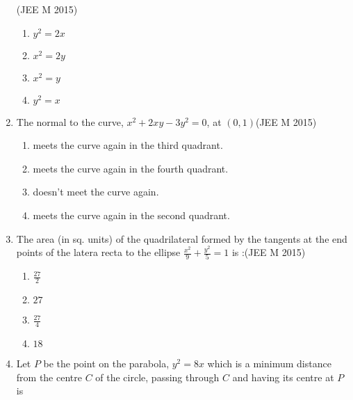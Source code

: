 \begin{enumerate}
\hfill(JEE M 2015)
\begin{enumerate}
    \item $y^2=2x$
    \item $x^2=2y$
    \item $x^2=y$
    \item $y^2=x$
\end{enumerate}
\item The normal to the curve, $x^2+2xy-3y^2=0$, at $(0,1)$\hfill(JEE M 2015)
\begin{enumerate}
    \item meets the curve again in the third quadrant.
    \item meets the curve again in the fourth quadrant.
    \item doesn't meet the curve again.
    \item meets the curve again in the second quadrant.
\end{enumerate}
\item The area (in sq. units) of the quadrilateral formed by the tangents at the end points of the latera recta to the ellipse $\frac{x^2}{9}+\frac{y^2}{5}=1$ is :\hfill(JEE M 2015)
\begin{enumerate}
    \item $\frac{27}{2}$
    \item $27$
    \item $\frac{27}{4}$
    \item $18$
\end{enumerate}
\item Let $P$ be the point on the parabola, $y^2=8x$ which is a minimum distance from the centre $C$ of the circle, passing through $C$ and having its centre at $P$ is


\end{enumerate}
